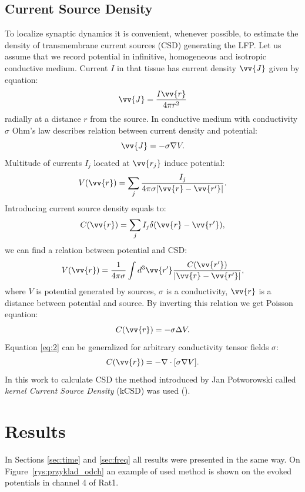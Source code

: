 \documentclass{pracalicmgr}
\begin{document}
   \section{Current Source Density}
   To localize synaptic dynamics it is convenient, whenever possible, to estimate the density of transmembrane current sources (CSD) generating the LFP. Let us assume that we record potential in infinitive, homogeneous and isotropic conductive medium. Current $I$ in that tissue has current density $\vv{J}$ given by equation:
   \begin{equation}
   \vv{J}= \frac{I \vv{r}}{4\pi r^2}
   \end{equation}
   radially at a distance $r$ from the source. In conductive medium with conductivity $\sigma$ Ohm's law describes relation between current density and potential:
   \begin{equation}
   \vv{J}=-\sigma \nabla V.
   \end{equation}
   Multitude of currents $I_j$ located at $\vv{r_j}$ induce potential:
   \begin{equation}
   V(\vv{r})=\sum_{j} \frac{I_j}{4 \pi \sigma |\vv{r}-\vv{r'}|} .
   \end{equation}
   Introducing current source density equals to:
   \begin{equation}
   C(\vv{r})=\sum_{j} I_j \delta (\vv{r}-\vv{r'}),
   \end{equation}
   we can find a relation between potential and CSD:
   \begin{equation}
   V(\vv{r})=\frac{1}{4\pi\sigma}\int d^3 \vv{r'} \frac{C(\vv{r'})}{|\vv{r}-\vv{r'}|},
   \end{equation}
   where $V$ is potential generated by sources, $\sigma$ is a conductivity, $\vv{r}$ is a distance between potential and source. By inverting this relation we get Poisson equation:
   \begin{equation}
   C(\vv{r})=-\sigma \Delta V.
   \label{eq:2}
   \end{equation}
   Equation \ref{eq:2} can be generalized for arbitrary conductivity tensor fields $\sigma$:
   \begin{equation}
   C(\vv{r})=-\nabla \cdot [\sigma \nabla V].
   \end{equation}
   In this work to calculate CSD the method introduced by Jan Potworowski called \textit{kernel Current Source Density} (kCSD) was used (\cite{potworowski, wojcik}).
    
    \chapter{Results}
	In Sections \ref{sec:time} and \ref{sec:freq} all results were presented in the same way. On Figure~\ref{rys:przyklad_odch} an example of used method is shown on the evoked potentials in channel 4 of Rat1.
	
\end{document}
